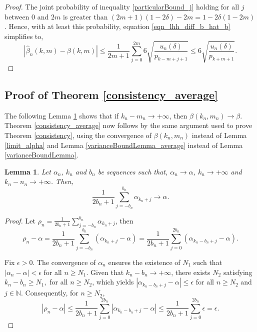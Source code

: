 \documentclass[sn-mathphys-ay]{sn-jnl}%
\newtheorem{lemma}{Lemma}[section]
\begin{document}
\begin{appendices}
\begin{proof}
    The joint probability of inequality \eqref{particularBound_j} holding for all
    \(j\) between \(0\) and \(2m\) is greater than \(\left( {2m + 1} \right)\left( {1
        - 2\delta } \right) - 2m = 1 - 2\delta \left( {1 - 2m} \right)\). Hence, with at
    least this probability, equation \eqref{eqn_lhh_diff_b_hat_b} simplifies to,
    \[\left| {\widehat \beta_n (k,m) - \beta (k,m)} \right| \leqslant \frac{1}{{2m + 1}}\sum\limits_{j = 0}^{2m} {6\sqrt {\frac{{{u_n}(\delta )}}{{{p_{k - m + j + 1}}}}} }  \leqslant 6\sqrt {\frac{{{u_n}(\delta )}}{{{p_{k + m + 1}}}}}.\]

\end{proof}

\subsection{Proof of Theorem \ref{consistency_average}}

The following Lemma \ref{limit_alpha_average} shows that if \(k_n-m_n\to +\infty\),
then $\beta \left( {{k_n},{m_n}} \right) \to \beta$. Theorem
\ref{consistency_average} now follows by the same argument used to prove Theorem
\ref{consistency}, using the convergence of $\beta \left( {{k_n},{m_n}} \right)$
instead of Lemma \ref{limit_alpha} and Lemma \ref{varianceBoundLemma_average} instead
of Lemma \ref{varianceBoundLemma}.

\begin{lemma}\label{limit_alpha_average}
    Let \(\alpha_n\), \(k_n\) and \(b_n\) be sequences such that,
    \(\alpha_n\to\alpha\), \(k_n\to +\infty\) and \(k_n-n_n\to +\infty\).
    Then,
    \[\frac{1}{{2{b_n} + 1}}\sum\limits_{j =  - {b_n}}^{{b_n}} {{\alpha _{{k_n} + j}}}  \to \alpha.\]
\end{lemma}
\begin{proof}
    Let \({\rho_n} = \frac{1}{{2{b_n} + 1}}\sum\limits_{j = - {b_n}}^{{b_n}}
    {{\alpha _{{k_n} + j}}}\), then
    \begin{equation*}
        {\rho_n} - \alpha  = \frac{1}{{2{b_n} + 1}}\sum\limits_{j =  - {b_n}}^{{b_n}} {\left( {{\alpha _{{k_n} + j}} - \alpha } \right)}  = \frac{1}{{2{b_n} + 1}}\sum\limits_{j = 0}^{2{b_n}} {\left( {{\alpha _{{k_n} - {b_n} + j}} - \alpha } \right)}.
    \end{equation*}

    Fix \(\epsilon > 0\). The convergence of \(\alpha_n\) ensures the existence of
    \(N_1\) such that \(\left| {{\alpha _n} - \alpha } \right| < \epsilon\) for all
    \(n \geq {N_1}\). Given that \(k_n-b_n\to +\infty\), there exists \(N_2\)
    satisfying \({k_n} - {b_n} \geq {N_1},\) for all \(n\geq N_2\), which yields
    \(\left| {{\alpha _{{k_n} - {b_n} + j}} - \alpha } \right| \leq \epsilon\) for
    all \(n\geq N_2\) and \(j\in\mathbb{N}\). Consequently, for \(n\geq N_2\),
    \begin{equation*}
        \left| {{\rho_n} - \alpha } \right| \leq \frac{1}{{2{b_n} + 1}}\sum\limits_{j = 0}^{2{b_n}} {\left| {{\alpha _{{k_n} - {b_n} + j}} - \alpha } \right|}  \leq \frac{1}{{2{b_n} + 1}}\sum\limits_{j = 0}^{2{b_n}}\epsilon=\epsilon.
    \end{equation*}
\end{proof}


\end{appendices}
\end{document}
